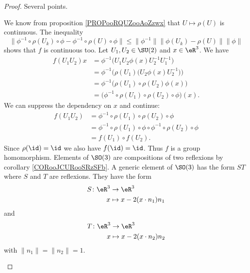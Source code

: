 \begin{proof}
	Several points.
	\begin{subproof}
		\spitem[Continuous]
		We know from proposition \ref{PROPooRQUZooAoZzwx} that \( U\mapsto \rho(U)\) is continuous. The inequality
		\begin{equation}
			\| \phi^{-1}\circ\rho(U_k)\circ \phi-\phi^{-1}\circ\rho(U)\circ\phi \|\leq \| \phi^{-1} \|\| \phi(U_k)-\rho(U) \|\| \phi \|
		\end{equation}
		shows that \( f\) is continuous too.
		Let \( U_1,U_2\in \SU(2)\) and \( x\in \eR^3\). We have
		\begin{subequations}
			\begin{align}
				f(U_1U_2)x & =\phi^{-1}\big( U_1U_2\phi(x)U_2^{-1}U_1^{-1} \big)             \\
				           & =\phi^{-1}\Big( \rho(U_1)\big( U_2\phi(x)U_2^{-1} \big) \Big)   \\
				           & =\phi^{-1}\big( \rho(U_1)\circ\rho(U_2)\phi(x) \big)            \\
				           & =\big( \phi^{-1}\circ\rho(U_1)\circ\rho(U_2)\circ\phi \big)(x).
			\end{align}
		\end{subequations}
		We can suppress the dependency on \( x\) and continue:
		\begin{subequations}
			\begin{align}
				f(U_1U_2) & =\phi^{-1}\circ\rho(U_1)\circ\rho(U_2)\circ\phi                        \\
				          & =\phi^{-1}\circ\rho(U_1)\circ\phi\circ\phi^{-1}\circ\rho(U_2)\circ\phi \\
				          & =f(U_1)\circ f(U_2).
			\end{align}
		\end{subequations}
		Since \( \rho(\id)=\id\) we also have \( f(\id)=\id\). Thus \( f\) is a group homomorphism.
		\spitem[Surjective]
		Elements of \( \SO(3)\) are compositions of two reflexions by corollary \ref{CORooJCURooSRzSFb}. A generic element of \( \SO(3)\) has the form \(ST \) where \( S\) and \( T\) are reflexions. They have the form
		\begin{equation}
			\begin{aligned}
				S\colon \eR^3 & \to \eR^3                  \\
				x             & \mapsto x-2(x\cdot n_1)n_1
			\end{aligned}
		\end{equation}
		and
		\begin{equation}
			\begin{aligned}
				T\colon \eR^3 & \to \eR^3                  \\
				x             & \mapsto x-2(x\cdot n_2)n_2
			\end{aligned}
		\end{equation}
		with \( \| n_1 \|=\| n_2 \|=1\).


\end{subproof}
\end{proof}
